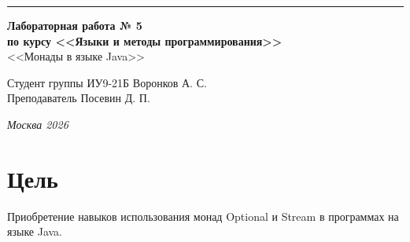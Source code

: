 \documentclass[a4paper, 14pt]{extarticle}
\begin{document}
\begin{titlepage}
\vspace*{-16pt}
\hspace{30pt}\rule{0.866\textwidth}{0.4pt}
  
\vspace{11em}

\begin{center}
\Large {\bf Лабораторная работа № 5} \\ 
\large {\bf по курсу <<Языки и методы программирования>>} \\ 
\large <<Монады в языке Java>>
\end{center}\normalsize

\vspace{8em}


\begin{flushright}
  {Студент группы ИУ9-21Б Воронков А. С.\hspace*{15pt} \\
  \vspace{2ex}
  Преподаватель Посевин Д. П.\hspace*{15pt}}
\end{flushright}

\bigskip

\vfill
 

\begin{center}
\textsl{Москва 2026}
\end{center}
\end{titlepage}

\renewcommand{\ttdefault}{pcr}

\setlength{\tabcolsep}{3pt}
\newpage
\setcounter{page}{2}

\section{Цель}\label{Sect::task}
\par 
Приобретение навыков использования монад Optional и Stream в программах на языке 
Java.    
\end{document}
